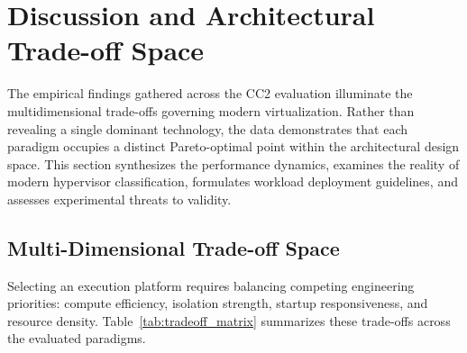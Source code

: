 \section{Discussion and Architectural Trade-off Space}
\label{sec:discussion}

The empirical findings gathered across the CC2 evaluation illuminate the multidimensional trade-offs governing modern virtualization. Rather than revealing a single dominant technology, the data demonstrates that each paradigm occupies a distinct Pareto-optimal point within the architectural design space. This section synthesizes the performance dynamics, examines the reality of modern hypervisor classification, formulates workload deployment guidelines, and assesses experimental threats to validity.

\subsection{Multi-Dimensional Trade-off Space}
\label{subsec:tradeoff_space}

Selecting an execution platform requires balancing competing engineering priorities: compute efficiency, isolation strength, startup responsiveness, and resource density. Table~\ref{tab:tradeoff_matrix} summarizes these trade-offs across the evaluated paradigms.


